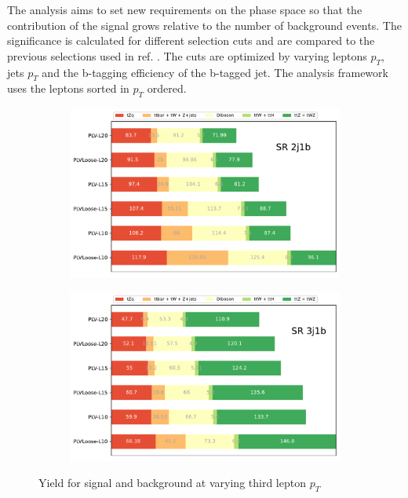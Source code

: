 The analysis aims to set new requirements on the phase space so that the contribution of the signal grows relative to the number of background events. The significance is calculated for different selection cuts and are compared to the previous selections used in ref. \cite{tZq2020}. The cuts are optimized by varying leptons $p_{T}$, jets $p_{T}$ and the b-tagging efficiency of the b-tagged jet. The analysis framework uses the leptons sorted in $p_{T}$ ordered.

\vspace*{-0.2cm}
\begin{figure}[h!] 
  \begin{subfigure}[b]{0.49\linewidth}
    \centering
    \includegraphics[width=\linewidth]{ubonn-thesis/Chapters/Chapters_05/Figure/Cuts Optimization/SR2j1b_PLVLoose.pdf}
    \end{subfigure}%
  \begin{subfigure}[b]{0.49\linewidth}
    \centering
    \includegraphics[width=\linewidth]{ubonn-thesis/Chapters/Chapters_05/Figure/Cuts Optimization/SR3j1b_PLVLoose.pdf} 
  \end{subfigure} 
  \vspace*{-0.2cm}
  \caption{Yield for signal and background at varying third lepton $p_{T}$ }
  \label{fig:third_lep}
  \end{figure}

